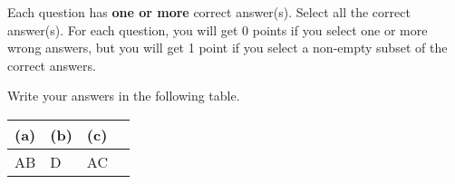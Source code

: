 
Each question has \textbf{one or more} correct answer(s). Select all the correct answer(s). For each question, you will get 0 points if you select one or more wrong answers, but you will get 1 point if you select a non-empty subset of the correct answers.

Write your answers in the following table.

\begin{table}[htbp]
    \centering
    \begin{tabular}{|p{2cm}|p{2cm}|p{2cm}|p{2cm}|}
        \hline
        (a) & (b) & (c) \\
        \hline
          AB  &  D   &  AC   \\
        \hline
    \end{tabular}
\end{table}

